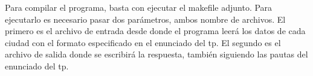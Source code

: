 Para compilar el programa, basta con ejecutar el makefile adjunto. Para ejecutarlo es necesario pasar dos parámetros, ambos nombre de archivos. El primero es el archivo de entrada desde donde 
el programa leerá los datos de cada ciudad con el formato especificado en el enunciado del tp. El segundo es el archivo de salida donde se escribirá la respuesta, también siguiendo las pautas del 
enunciado del tp.